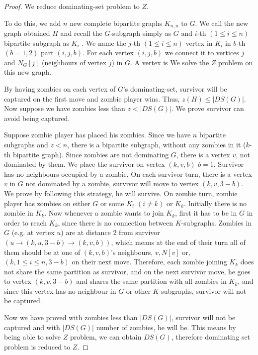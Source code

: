 \documentclass[1p]{elsarticle}
\begin{document}
	\begin{proof}
		We reduce dominating-set problem to $Z$.

		To do this, we add $n$ new complete bipartite graphs $K_{n,n}$ to $G$. We call the new graph obtained $H$ and
		recall the $G$-subgraph simply as $G$ and $i$-th $(1 \leq i \leq n)$ bipartite subgraph as $K_i$ . We name the
		$j$-th $(1 \leq i \leq n)$ vertex in $K_i$ in $b$-th $(b = 1,2)$ part $(i,j,b)$. For each
		vertex $(i,j,b)$ we connect it to vertices $j$ and $N_G[j]$ (neighbours of vertex $j$) in $G$. A vertex is We solve
		the $Z$ problem on this new graph.

		By having zombies on each vertex of $G$'s dominating-set, survivor will be captured on the first move and zombie
		player wins. Thus, $z(H) \leq |DS(G)|$. Now suppose we have zombies less than $z < |DS(G)|$. We prove survivor can
		avoid being captured.

		Suppose zombie player has placed his zombies. Since we have $n$ bipartite subgraphs and $z < n$, there is a
		bipartite subgraph, without any zombies in it ($k$-th bipartite graph). Since zombies are not dominating $G$,
		there is a vertex $v$, not dominated by them. We place the survivor on vertex $(k,v,b)$ $b = 1$. Survivor has no
		neighbours occupied by a zombie. On each survivor turn, there is a vertex $v$ in $G$ not dominated by a zombie,
		survivor will move to vertex $(k,v,3 - b)$. We prove by following this strategy, he will survive. On zombie
		turn, zombie player has zombies on either $G$ or some $K_i$ $(i \neq k)$ or $K_k$. Initially there is no zombie
		in $K_k$. Now whenever a zombie wants to join $K_k$, first it has to be in $G$ in order to reach $K_k$, since
		there is no connection between $K$-subgraphs. Zombies in $G$ (e.g. at vertex $u$) are at distance 2 from
		survivor $(u \rightarrow (k,u,3 - b) \rightarrow (k,v,b))$, which means at the end of their turn all of them should be at one of
		$(k,v,b)$'s neighbours, $v , N[v] $ or, $ (k,1 \leq i \leq n,3 - b)$  on their next move. Therefore, each zombie
		joining $K_k$ does not share the same partition as survivor, and on the next survivor move, he goes to vertex
		$(k,v,3-b)$ and shares the same partition with all zombies in $K_k$, and since this vertex has no neighbour in
		$G$ or other $K$-subgraphs, survivor will not be captured.

		Now we have proved with zombies less than $|DS(G)|$, survivor will not be captured and with $|DS(G)|$ number of
		zombies, he will be. This means by being able to solve $Z$ problem, we can obtain $DS(G)$, therefore dominating
		set problem is reduced to $Z$.

	\end{proof}
\end{document}
